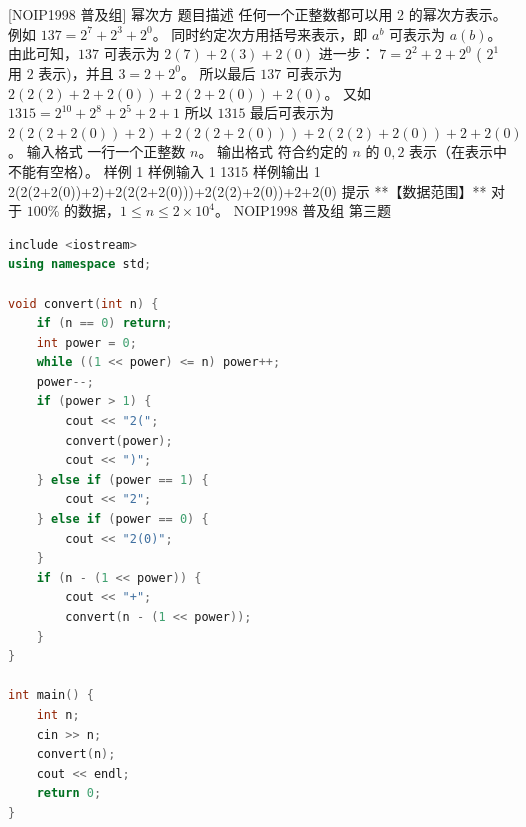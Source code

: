 \documentclass[12pt,twiside,a4paper]{ctexbook}
\numberwithin{chapter}{part}
\begin{document}
\section{}
 [NOIP1998 普及组] 幂次方
 题目描述
任何一个正整数都可以用 $2$ 的幂次方表示。例如 $137=2^7+2^3+2^0 $。
同时约定次方用括号来表示，即 $a^b$ 可表示为 $a(b)$。
由此可知，$137$ 可表示为 $2(7)+2(3)+2(0)$
进一步：
$7= 2^2+2+2^0$  ( $2^1$ 用 $2$ 表示)，并且 $3=2+2^0$。
所以最后 $137$ 可表示为 $2(2(2)+2+2(0))+2(2+2(0))+2(0)$。
又如 $1315=2^{10} +2^8 +2^5 +2+1$
所以 $1315$ 最后可表示为 $2(2(2+2(0))+2)+2(2(2+2(0)))+2(2(2)+2(0))+2+2(0)$。
 输入格式
一行一个正整数 $n$。
 输出格式
符合约定的 $n$ 的 $0, 2$ 表示（在表示中不能有空格）。
 样例 1
 样例输入 1
1315
 样例输出 1
2(2(2+2(0))+2)+2(2(2+2(0)))+2(2(2)+2(0))+2+2(0)
 提示
**【数据范围】**
对于 $100\%$ 的数据，$1 \le n \le 2 \times {10}^4$。
NOIP1998 普及组 第三题
\begin{lstlisting}[language=c++,breaklines=true]
include <iostream>
using namespace std;

void convert(int n) {
    if (n == 0) return;
    int power = 0;
    while ((1 << power) <= n) power++;
    power--;
    if (power > 1) {
        cout << "2(";
        convert(power);
        cout << ")";
    } else if (power == 1) {
        cout << "2";
    } else if (power == 0) {
        cout << "2(0)";
    }
    if (n - (1 << power)) {
        cout << "+";
        convert(n - (1 << power));
    }
}

int main() {
    int n;
    cin >> n;
    convert(n);
    cout << endl;
    return 0;
}
\end{lstlisting}

\section{}
\begin{lstlisting}[language=c++,breaklines=true]

\end{lstlisting}
\end{document}
